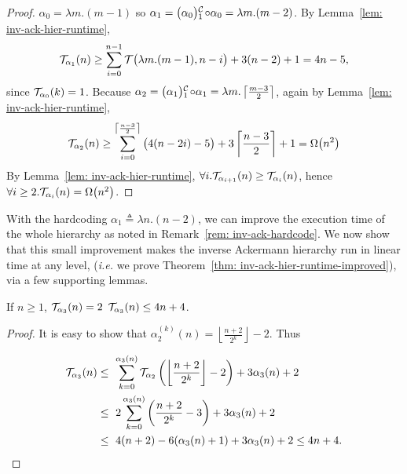 \begin{proof}
	$\alpha_0 = \lambda m.(m-1)$ so $\alpha_1 = \cdt{\big(\alpha_0\big)}{1}\circ \alpha_0 = \lambda m.(m - 2)$. By Lemma~\ref{lem: inv-ack-hier-runtime},
	\begin{equation*}
	\mathcal{T}_{\alpha_1}(n) \ge \sum_{i=0}^{n-1} \mathcal{T}\big(\lambda m.(m-1), n - i\big) + 3(n - 2) + 1 = 4n - 5\text{,}
	\end{equation*}
	since $\mathcal{T}_{\alpha_0}(k) = 1$. Because $\alpha_2 = \cdt{\big(\alpha_1\big)}{1}\circ \alpha_1 = \lambda m.\left\lceil \frac{m-3}{2} \right\rceil$, again by Lemma~\ref{lem: inv-ack-hier-runtime},
	\begin{equation*}
	\mathcal{T}_{\alpha_2}(n)
	\ge \sum_{i=0}^{\left\lceil \frac{n-3}{2} \right\rceil} \big(4(n-2i) - 5\big) + 3\left\lceil \frac{n-3}{2} \right\rceil + 1
	= \Omega\big(n^2\big)
	\end{equation*}
	By Lemma~\ref{lem: inv-ack-hier-runtime}, $\forall i. \mathcal{T}_{\alpha_{i+1}}(n)\ge \mathcal{T}_{\alpha_i}(n)$, hence $\forall i\ge 2. \mathcal{T}_{\alpha_i}(n) = \Omega\big(n^2\big)$.
\end{proof}


With the hardcoding $\alpha_1 \triangleq \lambda n.(n - 2)$, we can improve the execution time of the whole hierarchy as noted in Remark~\ref{rem: inv-ack-hardcode}. We now show that this small improvement makes the inverse Ackermann hierarchy run in linear time at any level, (\emph{i.e.} we prove Theorem~\ref{thm: inv-ack-hier-runtime-improved}), via a few supporting lemmas.

\begin{lem} \label{lem: inv-ack-3-runtime}
	If $n\ge 1$, $\mathcal{T}_{\alpha_3}(n) = 2$ $\mathcal{T}_{\alpha_3}(n) \le 4n + 4$.
\end{lem}

\begin{proof}
	It is easy to show that $\alpha_2^{(k)}(n) = \left\lfloor \frac{n+2}{2^k} \right\rfloor - 2$. Thus
	
	\begin{equation*}
	\begin{aligned}
		\runtime_{\alpha_3}(n)
		&  \le \ \sum_{k=0}^{\alpha_{3}(n)}\runtime_{\alpha_2}\left(\left\lfloor \frac{n+2}{2^k} \right\rfloor - 2\right) + 3\alpha_{3}(n) + 2 \\
		& \le \ 2\sum_{k=0}^{\alpha_3(n)}\left(\frac{n+2}{2^k} - 3\right) + 3\alpha_3(n) + 2 \\
		& \le \ 4(n + 2) - 6(\alpha_3(n) + 1) + 3\alpha_3(n) + 2 \le 4n + 4.
	\end{aligned}
\end{equation*}
\end{proof}

